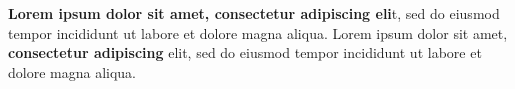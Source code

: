 \textbf{Lorem ipsum dolor sit amet, consectetur adipiscing eli}t, sed do eiusmod tempor incididunt ut labore et dolore magna aliqua.
Lorem ipsum dolor sit amet,\textbf{ consectetur adipiscing} elit, sed do eiusmod tempor incididunt ut labore et dolore magna aliqua.
